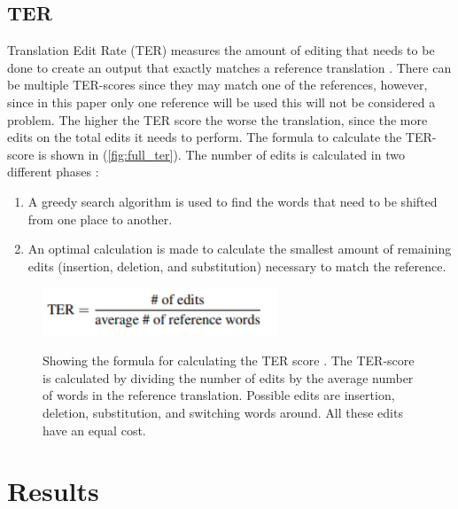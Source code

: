 \subsection{TER}

Translation Edit Rate (TER) measures the amount of editing that needs to be done to create an output that exactly matches a reference translation \cite{TERsnover2006}. There can be multiple TER-scores since they may match one of the references, however, since in this paper only one reference will be used this will not be considered a problem. The higher the TER score the worse the translation, since the more edits on the total edits it needs to perform. The formula to calculate the TER-score is shown in (\autoref{fig:full_ter}). The number of edits is calculated in two different phases \cite{shapira2002edit}:
\begin{enumerate}
    \item A greedy search algorithm is used to find the words that need to be shifted from one place to another.
    \item An optimal calculation is made to calculate the smallest amount of remaining edits (insertion, deletion, and substitution) necessary to match the reference.
\end{enumerate}



\begin{figure}[h]
 \caption{Showing the formula for calculating the TER score \cite{TERsnover2006}. The TER-score is calculated by dividing the number of edits by the average number of words in the reference translation. Possible edits are insertion, deletion, substitution, and switching words around. All these edits have an equal cost.}
 \centering 
 \includegraphics[width=7cm]{Bachelor CSAI thesis template/images/ter_formula.PNG}
 \label{fig:full_ter}
\end{figure}


\break

\section{Results}

